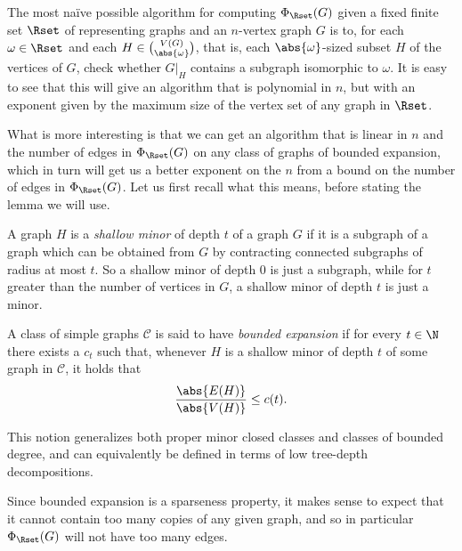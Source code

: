 \documentclass[a4paper,reqno,oneside]{article} %
\begin{document}
The most naïve possible algorithm for computing $\Phi_\Rset(G)$ given a fixed finite set $\Rset$ of representing graphs and an $n$-vertex graph $G$ is to, for each $\omega \in \Rset$ and each $H \in \binom{V(G)}{\abs{\omega}}$, that is, each $\abs{\omega}$-sized subset $H$ of the vertices of $G$, check whether $G|_H$ contains a subgraph isomorphic to $\omega$. It is easy to see that this will give an algorithm that is polynomial in $n$, but with an exponent given by the maximum size of the vertex set of any graph in $\Rset$.

What is more interesting is that we can get an algorithm that is linear in $n$ and the number of edges in $\Phi_\Rset(G)$ on any class of graphs of bounded expansion, which in turn will get us a better exponent on the $n$ from a bound on the number of edges in $\Phi_\Rset(G)$. Let us first recall what this means, before stating the lemma we will use.

\begin{definition}
    A graph $H$ is a \emph{shallow minor} of depth $t$ of a graph $G$ if it is a subgraph of a graph which can be obtained from $G$ by contracting connected subgraphs of radius at most $t$. So a shallow minor of depth $0$ is just a subgraph, while for $t$ greater than the number of vertices in $G$, a shallow minor of depth $t$ is just a minor.

    A class of simple graphs $\mathcal{C}$ is said to have \emph{bounded expansion} if for every $t \in \N$ there exists a $c_t$ such that, whenever $H$ is a shallow minor of depth $t$ of some graph in $\mathcal{C}$, it holds that
    $$\frac{\abs{E(H)}}{\abs{V(H)}} \leq c(t).$$

    This notion generalizes both proper minor closed classes and classes of bounded degree, and can equivalently be defined in terms of low tree-depth decompositions.\cite{NESETRIL_bounded_expansion}
\end{definition}

Since bounded expansion is a sparseness property, it makes sense to expect that it cannot contain too many copies of any given graph, and so in particular $\Phi_\Rset(G)$ will not have too many edges.
\end{document}
